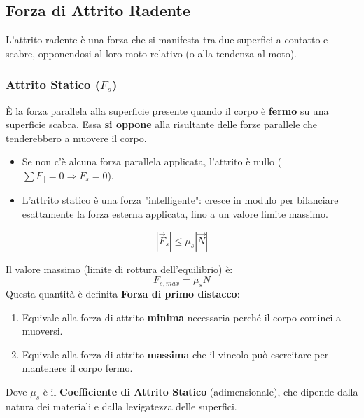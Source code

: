 
\subsection{Forza di Attrito Radente}
L'attrito radente è una forza che si manifesta tra due superfici a contatto e scabre, opponendosi al loro moto relativo (o alla tendenza al moto).

\subsubsection{Attrito Statico ($F_s$)}
È la forza parallela alla superficie presente quando il corpo è \textbf{fermo} su una superficie scabra. Essa \textbf{si oppone} alla risultante delle forze parallele che tenderebbero a muovere il corpo.
\begin{itemize}
    \item Se non c'è alcuna forza parallela applicata, l'attrito è nullo ($\sum F_{\parallel} = 0 \Rightarrow F_s = 0$).
    \item L'attrito statico è una forza "intelligente": cresce in modulo per bilanciare esattamente la forza esterna applicata, fino a un valore limite massimo.
\end{itemize}

\begin{equation}
    |\vec{F}_s| \le \mu_s |\vec{N}|
\end{equation}

Il valore massimo (limite di rottura dell'equilibrio) è:
\[ F_{s,max} = \mu_s N \]
Questa quantità è definita \textbf{Forza di primo distacco}:
\begin{enumerate}
    \item Equivale alla forza di attrito \textbf{minima} necessaria perché il corpo cominci a muoversi.
    \item Equivale alla forza di attrito \textbf{massima} che il vincolo può esercitare per mantenere il corpo fermo.
\end{enumerate}

Dove $\mu_s$ è il \textbf{Coefficiente di Attrito Statico} (adimensionale), che dipende dalla natura dei materiali e dalla levigatezza delle superfici.

